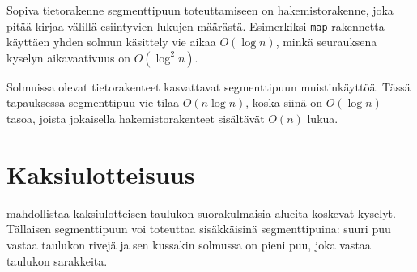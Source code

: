 Sopiva tietorakenne segmenttipuun toteuttamiseen on
hakemistorakenne, joka pitää kirjaa välillä esiintyvien
lukujen määrästä.
Esimerkiksi \texttt{map}-ra\-ken\-net\-ta käyttäen
yhden solmun käsittely vie aikaa $O(\log n)$,
minkä seurauksena kyselyn aikavaativuus on $O(\log^2 n)$.

Solmuissa olevat tietorakenteet kasvattavat
segmenttipuun muistinkäyttöä.
Tässä tapauksessa
segmenttipuu vie tilaa $O(n \log n)$,
koska siinä on $O(\log n)$ tasoa, joista
jokaisella hakemistorakenteet sisältävät $O(n)$ lukua.

\section{Kaksiulotteisuus}


 mahdollistaa
kaksiulotteisen taulukon
suorakulmaisia alueita koskevat kyselyt.
Tällaisen segmenttipuun voi toteuttaa
sisäkkäisinä segmenttipuina:
suuri puu vastaa taulukon rivejä
ja sen kussakin solmussa on pieni puu,
joka vastaa taulukon sarakkeita.

